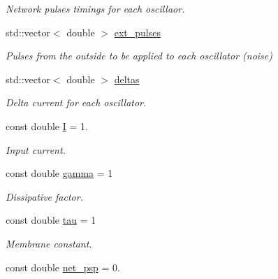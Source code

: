 \begin{DoxyCompactItemize}
\begin{DoxyCompactList}\small\item\em Network pulses timings for each oscillaor. \end{DoxyCompactList}\item 
\hypertarget{classLifNetSim_a1d9510b253810e9520362cf1de3df153}{std\-::vector$<$ double $>$ \hyperlink{classLifNetSim_a1d9510b253810e9520362cf1de3df153}{ext\-\_\-pulses}}\label{classLifNetSim_a1d9510b253810e9520362cf1de3df153}

\begin{DoxyCompactList}\small\item\em Pulses from the outside to be applied to each oscillator (noise) \end{DoxyCompactList}\item 
\hypertarget{classLifNetSim_a4281a22581bec2e098e0b9f81ac3e6c7}{std\-::vector$<$ double $>$ \hyperlink{classLifNetSim_a4281a22581bec2e098e0b9f81ac3e6c7}{deltas}}\label{classLifNetSim_a4281a22581bec2e098e0b9f81ac3e6c7}

\begin{DoxyCompactList}\small\item\em Delta current for each oscillator. \end{DoxyCompactList}\item 
\hypertarget{classLifNetSim_acab972029d8f56327aa925db344feae6}{const double \hyperlink{classLifNetSim_acab972029d8f56327aa925db344feae6}{I} = 1.}\label{classLifNetSim_acab972029d8f56327aa925db344feae6}

\begin{DoxyCompactList}\small\item\em Input current. \end{DoxyCompactList}\item 
\hypertarget{classLifNetSim_abc773998c942f9eff71eb4a048ea8902}{const double \hyperlink{classLifNetSim_abc773998c942f9eff71eb4a048ea8902}{gamma} = 1}\label{classLifNetSim_abc773998c942f9eff71eb4a048ea8902}

\begin{DoxyCompactList}\small\item\em Dissipative factor. \end{DoxyCompactList}\item 
\hypertarget{classLifNetSim_a2c7ce3fdae67e8ba8d07990fa61e951c}{const double \hyperlink{classLifNetSim_a2c7ce3fdae67e8ba8d07990fa61e951c}{tau} = 1}\label{classLifNetSim_a2c7ce3fdae67e8ba8d07990fa61e951c}

\begin{DoxyCompactList}\small\item\em Membrane constant. \end{DoxyCompactList}\item 
\hypertarget{classLifNetSim_ac81b717626bcdfe86f5b80091f9fcf75}{const double \hyperlink{classLifNetSim_ac81b717626bcdfe86f5b80091f9fcf75}{net\-\_\-psp} = 0.}\label{classLifNetSim_ac81b717626bcdfe86f5b80091f9fcf75}


\end{DoxyCompactItemize}
